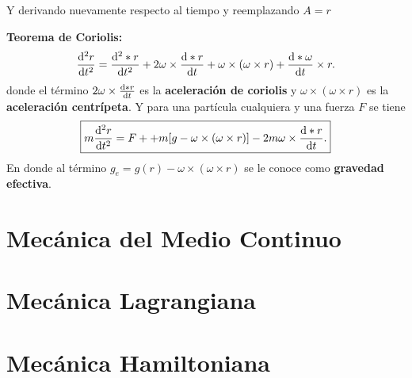 Y derivando nuevamente respecto al tiempo y reemplazando $A=r$
\begin{teorema}
	\textbf{Teorema de Coriolis: }
	\begin{equation}
		\dv[2]{r}{t} = \dv[2]{* r}{t} + 2\omega \times \dv{* r}{t} + \omega \times (\omega \times r) + \dv{* \omega}{t} \times r.
	\end{equation}
	donde el término $2\omega \times \dv{* r}{t}$ es la \textbf{aceleración de coriolis} y $\omega \times (\omega \times r)$ es la \textbf{aceleración centrípeta}. Y para una partícula cualquiera y una fuerza $F$ se tiene
	\begin{equation}
		\boxed{ m\dv[2]{r}{t} = F + + m[g - \omega \times (\omega \times r)] - 2m\omega \times \dv{*r}{t}. }
	\end{equation}
	En donde al término $g_e = g(r) - \omega \times (\omega \times r)$ se le conoce como \textbf{gravedad efectiva}.
\end{teorema}








\chapter{Mecánica del Medio Continuo}















\chapter{Mecánica Lagrangiana}
















\chapter{Mecánica Hamiltoniana}



















